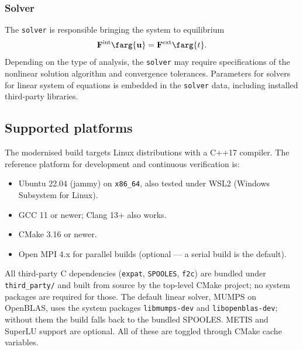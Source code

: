 \subsubsection{Solver}
The \texttt{solver} is responsible bringing the system to equilibrium
\[
\mathbf{F}^{\textrm{int}}\farg{\mathbf{u}} =
\mathbf{F}^{\textrm{ext}}\farg{t}.
\]
Depending on the type of analysis, the \texttt{solver} may require 
specifications of the nonlinear solution algorithm and 
convergence tolerances. 
Parameters for solvers for linear system of equations is embedded in 
the \texttt{solver} data, including installed third-party libraries.

\subsection{Supported platforms}
\label{sect.platforms}
The modernised \tahoe build targets Linux distributions with a C++17
compiler.  The reference platform for development and continuous
verification is:
\begin{itemize}
\item Ubuntu 22.04 (jammy) on \texttt{x86\_64}, also tested under
      WSL2 (Windows Subsystem for Linux).
\item GCC 11 or newer; Clang 13+ also works.
\item CMake 3.16 or newer.
\item Open MPI 4.x for parallel builds (optional --- a serial build
      is the default).
\end{itemize}
All third-party C dependencies (\texttt{expat}, \texttt{SPOOLES},
\texttt{f2c}) are bundled under \texttt{third\_party/} and built from
source by the top-level CMake project; no system packages are required
for those.  The default linear solver, MUMPS on OpenBLAS, uses the
system packages \texttt{libmumps-dev} and \texttt{libopenblas-dev}; without
them the build falls back to the bundled SPOOLES.  METIS and SuperLU
support are optional.  All of these are toggled through CMake cache
variables.